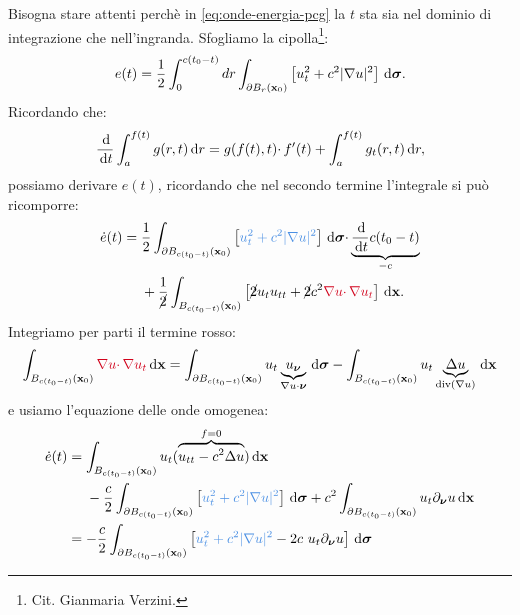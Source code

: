 \begin{dimostrazione}
    Bisogna stare attenti perchè in \eqref{eq:onde-energia-pcg} la $t$ sta sia nel dominio di integrazione che nell'ingranda. Sfogliamo la cipolla\footnote{Cit. Gianmaria Verzini.}:
    \begin{equation*}
        e(t) =\frac{1}{2}\int _{0}^{c(t_{0} -t)} dr\int _{\partial B_{r}(\mathbf{x}_{0})}\left[ u_{t}^{2} +c^{2}| \nabla u| ^{2}\right] \,\mathrm d \bm{\sigma} .
    \end{equation*}
    Ricordando che:
    \begin{equation*}
        \frac{\,\mathrm d}{\,\mathrm d t}\int _{a}^{f(t)} g(r,t) \,\mathrm d r=g(f(t),t) \cdotp f'(t) +\int _{a}^{f(t)} g_{t}(r,t) \,\mathrm d r,
    \end{equation*}
    possiamo derivare $e(t)$, ricordando che nel secondo termine l'integrale si può ricomporre:
    \begin{align*}
        \dot{e}(t) & =\frac{1}{2}\int _{\partial B_{c(t_{0} -t)}(\x_{0})}\left[\textcolor[rgb]{0.29,0.56,0.89}{u_{t}^{2}+c^{2}| \nabla u| ^{2}}\right] \dsig \cdotp \underbrace{\frac{\de}{\dt} c(t_{0} -t)}_{-c} \\
                   & \ \ \ \ +\frac{1}{\cancel{2}}\int _{B_{c(t_{0} -t)}(\x_{0})}\left[\cancel{2} u_{t} u_{tt} +\cancel{2} c^{2}\textcolor[rgb]{0.82,0.01,0.11}{\nabla u\cdotp \nabla u_{t}}\right] \dxx.
    \end{align*}
    Integriamo per parti il termine rosso:
    \begin{equation*}
        \int _{B_{c(t_{0} -t)}(\x_{0})}\textcolor[rgb]{0.82,0.01,0.11}{\nabla u\cdotp \nabla u_{t}} \dxx =\int _{\partial B_{c(t_{0} -t)}(\x_{0})} u_{t}\underbrace{u_{\bm{\nu }}}_{\nabla u\cdotp \bm{\nu }} \dsig -\int _{B_{c(t_{0} -t)}(\x_{0})} u_{t}\underbrace{\Delta u}_{\mathrm{div}(\nabla u)} \dxx
    \end{equation*}
    e usiamo l'equazione delle onde omogenea:
    \begin{align*}
        \dot{e}(t) & =\int _{B_{c(t_{0} -t)}(\x_{0})} u_{t}(\overbrace{u_{tt} -c^{2} \Delta u}^{f=0}) \dxx                                                                                                                                            \\
                   & \ \ \ \ -\frac{c}{2}\int _{\partial B_{c(t_{0} -t)}(\x_{0})}\left[\textcolor[rgb]{0.29,0.56,0.89}{u_{t}^{2}+c^{2}| \nabla u| ^{2}}\right] \dsig +c^{2}\int _{\partial B_{c(t_{0} -t)}(\x_{0})} u_{t} \partial _{\bm{\nu }} u\dxx \\
                   & =-\frac{c}{2}\int _{\partial B_{c(t_{0} -t)}(\x_{0})}\left[\textcolor[rgb]{0.29,0.56,0.89}{u_{t}^{2}+c^{2}| \nabla u| ^{2}} -2c\ u_{t} \partial _{\bm{\nu }} u\right] \dsig                                                      \\

\end{align*}
\end{dimostrazione}

